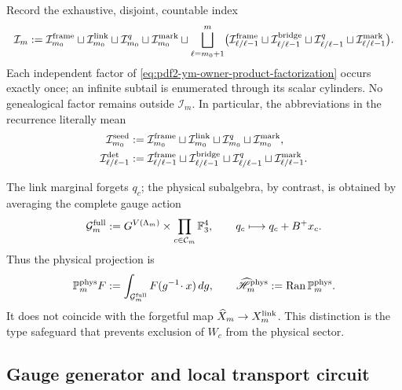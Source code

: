 Record the exhaustive, disjoint, countable index
\begin{equation}\label{eq:pdf2-ym-owner-exhaustive-index}
 \mathcal I_m
 :=\mathcal I_{m_0}^{\rm frame}
 \sqcup\mathcal I_{m_0}^{\rm link}
 \sqcup\mathcal I_{m_0}^{q}
 \sqcup\mathcal I_{m_0}^{\rm mark}
 \sqcup\bigsqcup_{\ell=m_0+1}^{m}
 \bigl(
   \mathcal I_{\ell/\ell-1}^{\rm frame}
   \sqcup\mathcal I_{\ell/\ell-1}^{\rm bridge}
   \sqcup\mathcal I_{\ell/\ell-1}^{q}
   \sqcup\mathcal I_{\ell/\ell-1}^{\rm mark}
 \bigr).
\end{equation}
Each independent factor of \eqref{eq:pdf2-ym-owner-product-factorization} occurs
exactly once; an infinite subtail is enumerated through its scalar cylinders. No
genealogical factor remains outside $\mathcal I_m$.
In particular, the abbreviations in the recurrence literally mean
\begin{equation}\label{eq:pdf2-ym-owner-index-abbreviations}
 \begin{aligned}
 \mathcal I_{m_0}^{\rm seed}
 &:={\mathcal I}_{m_0}^{\rm frame}\sqcup
    {\mathcal I}_{m_0}^{\rm link}\sqcup
    {\mathcal I}_{m_0}^{q}\sqcup
    {\mathcal I}_{m_0}^{\rm mark},\\
 \mathcal I_{\ell/\ell-1}^{\rm det}
 &:={\mathcal I}_{\ell/\ell-1}^{\rm frame}\sqcup
    {\mathcal I}_{\ell/\ell-1}^{\rm bridge}\sqcup
    {\mathcal I}_{\ell/\ell-1}^{q}\sqcup
    {\mathcal I}_{\ell/\ell-1}^{\rm mark}.
 \end{aligned}
\end{equation}

The link marginal forgets $q_c$; the physical subalgebra, by contrast, is obtained
by averaging the complete gauge action
\begin{equation}\label{eq:pdf2-ym-full-gauge-group}
 \mathcal G_m^{\rm full}
 :=G^{V(\Lambda_m)}\times
 \prod_{c\in\mathcal C_m}\mathbb F_3^4,
 \qquad q_c\longmapsto q_c+B^+x_c.
\end{equation}
Thus the physical projection is
\begin{equation}\label{eq:pdf2-ym-full-physical-projection}
 \mathbb P_m^{\rm phys}F
 :=\int_{\mathcal G_m^{\rm full}}F(g^{-1}\!\cdot x)\,dg,
 \qquad
 \widehat{\mathscr H}_m^{\rm phys}
 :=\operatorname{Ran}\mathbb P_m^{\rm phys}.
\end{equation}
It does not coincide with the forgetful map
$\widehat X_m\to X_m^{\rm link}$. This distinction is the type safeguard
that prevents exclusion of $W_c$ from the physical sector.

\subsection{Gauge generator and local transport circuit}

